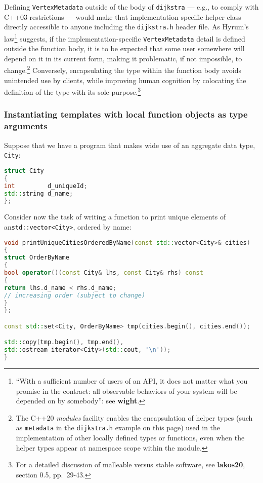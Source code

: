 \noindent Defining \texttt{VertexMetadata} outside of the body of
\texttt{dijkstra} --- e.g., to comply with C++03 restrictions --- would
make that implementation-specific helper class directly accessible to
anyone including the \texttt{dijkstra.h} header file. As Hyrum's
law{\cprotect\footnote{``With a sufficient number
of users of an API, it does not matter what you promise in the
contract: all observable behaviors of your system will be depended on
by somebody'': see \textbf{wight}.}} suggests, if the
imple\-men\-tation-specific \texttt{VertexMetadata} detail is defined
outside the function body, it is to be expected that some user somewhere
will depend on it in its current form, making it problematic, if not
impossible, to change.\footnote{The C++20 \emph{modules} facility enables the
encapsulation of helper types (such as \texttt{metadata} in the \mbox{\texttt{dijkstra.h}} example on this page) used in
the implementation of other locally defined types or functions, even
when the helper types appear at namespace scope within the module.} Conversely, encapsulating
the type within the function body avoids unintended use by clients,
while improving human cognition by colocating the definition of the
type with its sole purpose.{\cprotect\footnote{For a detailed
discussion of malleable  versus stable software, see \textbf{{lakos20}},
section 0.5, pp.~29-43.}}

\subsubsection[Instantiating templates with local function objects as type arguments]{Instantiating templates with local function objects as type arguments}\label{instantiating-templates-with-local-function-objects-as-type-arguments}

Suppose that we have a program that makes wide use of an aggregate data
type, \texttt{City}:

\begin{lstlisting}[language=C++]
struct City
{
int         d_uniqueId;
std::string d_name;
};
\end{lstlisting}

\noindent Consider now the task of writing a function to print unique elements of
an\linebreak[4] \texttt{std::vector<City>}, ordered by name:

\begin{lstlisting}[language=C++]
void printUniqueCitiesOrderedByName(const std::vector<City>& cities)
{
struct OrderByName
{
bool operator()(const City& lhs, const City& rhs) const
{
return lhs.d_name < rhs.d_name;
// increasing order (subject to change)
}
};

const std::set<City, OrderByName> tmp(cities.begin(), cities.end());

std::copy(tmp.begin(), tmp.end(),
std::ostream_iterator<City>(std::cout, '\n'));
}
\end{lstlisting}


